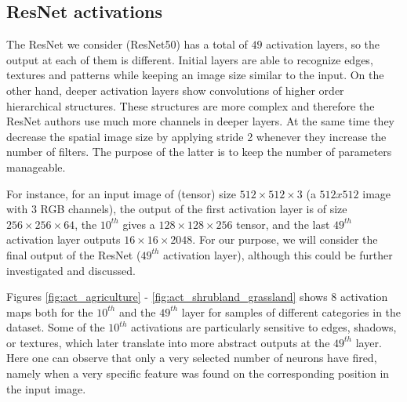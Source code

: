 \subsection{ResNet activations}

The ResNet we consider (ResNet50) has a total of $49$ activation layers, so the output at each of them is different. Initial layers are able to recognize edges, textures and patterns while keeping an image size similar to the input. On the other hand, deeper activation layers show convolutions of higher order hierarchical structures. These structures are more complex and therefore the ResNet authors use much more channels in deeper layers. At the same time they decrease the spatial image size by applying stride 2 whenever they increase the number of filters. The purpose of the latter is to keep the number of parameters manageable.  

For instance, for an input image of (tensor) size $512 \times 512 \times 3$ (a $512x512$ image with $3$ RGB channels), the output of the first activation layer is of size $256 \times 256 \times 64$, the $10^{th}$ gives a $128 \times 128 \times 256$ tensor, and the last $49^{th}$ activation layer outputs $16 \times 16 \times 2048$. For our purpose, we will consider the final output of the ResNet ($49^{th}$ activation layer), although this could be further investigated and discussed.

Figures \ref{fig:act_agriculture} - \ref{fig:act_shrubland_grassland} shows 8 activation maps both for the $10^{th}$ and the $49^{th}$ layer for samples of different categories in the dataset. Some of the $10^{th}$ activations are particularly sensitive to edges, shadows, or textures, which later translate into more abstract outputs at the $49^{th}$ layer. Here one can observe that only a very selected number of neurons have fired, namely when a very specific feature was found on the corresponding position in the input image.

